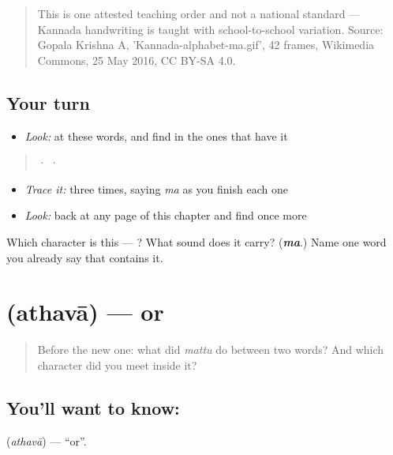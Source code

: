 \begin{quote}
This is one attested teaching order and not a national standard — Kannada handwriting is taught with school-to-school variation. Source: Gopala Krishna A, 'Kannada-alphabet-ma.gif', 42 frames, Wikimedia Commons, 25 May 2016, CC BY-SA 4.0.
\end{quote}

\subsection*{Your turn}
\begin{itemize}
\raggedright
  \item \emph{Look:} at these words, and find  in the ones that have it
\end{itemize}

\begin{quote}
  ·    ·  
\end{quote}

\begin{itemize}
\raggedright
  \item \emph{Trace it:}  three times, saying \emph{ma} as you finish each one
  \item \emph{Look:} back at any page of this chapter and find  once more
\end{itemize}

\begin{tcolorbox}[breakable,colback=teal!4,colframe=teal!35!black,title={Before you move on}]
Which character is this — ? What sound does it carry? (\emph{\textbf{ma}}.) Name one word you already say that contains it.
\end{tcolorbox}
\section[\texorpdfstring{\kn{ಅಥವಾ} (athavā)}{ಅಥವಾ (athavā)}]{ (athavā) — or}

\label{lesson:KA-C67-or}



\begin{quote}
Before the new one: what did \emph{mattu} do between two words? And which character did you meet inside it?
\end{quote}

\subsection*{You'll want to know: }
\textbf{} (\emph{athavā}) — \textquotedblleft{}or\textquotedblright{}.

